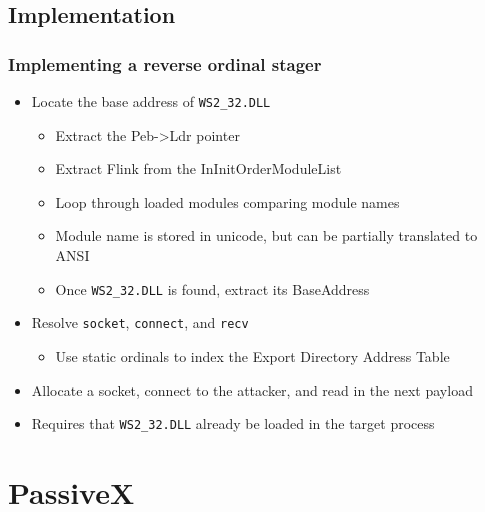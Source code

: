 \documentclass{beamer}
\newenvironment{sitemize}{\vspace{1mm}\begin{itemize}\itemsep 4pt\small}{\end{itemize}}
\begin{document}
\subsection{Implementation}
\begin{frame}[t]
    \frametitle{Implementing a reverse ordinal stager}

    \begin{sitemize}
        \item Locate the base address of \texttt{WS2\_32.DLL}
        \begin{sitemize}
            \item Extract the Peb->Ldr pointer
            \item Extract Flink from the InInitOrderModuleList
            \item Loop through loaded modules comparing module names
            \item Module name is stored in unicode, but can be
            partially translated to ANSI
            \item Once \texttt{WS2\_32.DLL} is found, extract its
            BaseAddress
        \end{sitemize}

        \pause
        \item Resolve \texttt{socket}, \texttt{connect},
        and \texttt{recv}
        \begin{sitemize}
            \item Use static ordinals to index the Export Directory Address Table
        \end{sitemize}

        \pause
        \item Allocate a socket, connect to the attacker,
        and read in the next payload

        \pause
        \item Requires that \texttt{WS2\_32.DLL} already be loaded
        in the target process
    \end{sitemize}

\end{frame}

\section{PassiveX}
\end{document}
